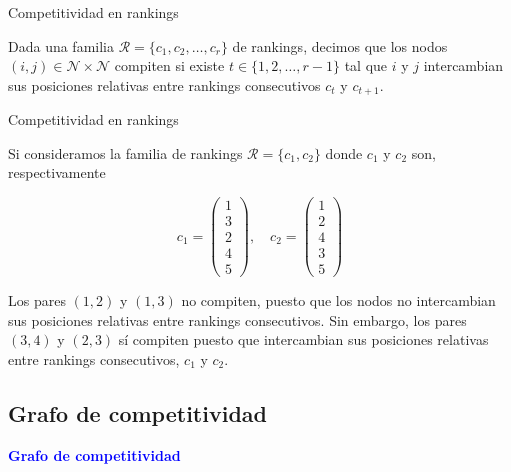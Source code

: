 \documentclass[10pt,hyperref={unicode}]{beamer}
\begin{document}
	\begin{frame}{Competitividad en rankings}
		\begin{defi}
			Dada una familia $\mathcal{R} = \{c_1, c_2, \dots, c_r\}$ de rankings, decimos que los nodos $(i,j) \in \mathcal{N} \times \mathcal{N}$ compiten si existe $t \in \{1,2,\dots, r-1\}$ tal que $i$ y $j$ intercambian sus posiciones relativas entre rankings consecutivos $c_t$ y $c_{t+1}$.
		\end{defi}
	\end{frame}
	
	\begin{frame}{Competitividad en rankings}
		\begin{ejemplo}
			Si consideramos la familia de rankings $\mathcal{R} = \{c_1, c_2\}$ donde $c_1$ y $c_2$ son, respectivamente
			
			\begin{equation*}
			c_1 = \left( \begin{array}{c}
			1\\
			3\\
			2\\
			4\\
			5
			\end{array} \right), \quad
			c_2 = \left( \begin{array}{c}
			1\\
			2\\
			4\\
			3\\
			5
			\end{array} \right)
			\end{equation*}
			
			Los pares $(1,2)$ y $(1,3)$ no compiten, puesto que los nodos no intercambian sus posiciones relativas entre rankings consecutivos. Sin embargo, los pares $(3,4)$ y $(2,3)$ sí compiten puesto que intercambian sus posiciones relativas entre rankings consecutivos, $c_1$ y $c_2$.
		\end{ejemplo}
	\end{frame}
	
	\subsection*{Grafo de competitividad}
	
	\begin{frame}
		\begin{center}
			\Huge\textbf{\textsf{\textcolor{blue}{Grafo de competitividad}}}
		\end{center}
	\end{frame}
	
\end{document}
